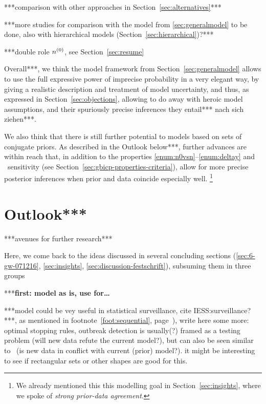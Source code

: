 ***comparison with other approaches in Section~\ref{sec:alternatives}***

***more studies for comparison with the model from \ref{sec:generalmodel} to be done,
also with hierarchical models (Section~\ref{sec:hierarchical})?***

***double role $n^{(0)}$, see Section~\ref{sec:resume}



Overall***, we think the model framework from Section~\ref{sec:generalmodel}
allows to use the full expressive power of imprecise probability %
in a very elegant way, by giving a realistic description and treatment
of model uncertainty, and thus, as expressed in Section~\ref{sec:objections},
allowing to do away with heroic model assumptions, and their spuriously precise inferences they entail*** nach sich ziehen***.

We also think that there is still further potential to models based on sets of conjugate priors.
As described in the Outlook below***,
further advances are within reach 
that, in addition to the properties \ref{enum:n0vsn}--\ref{enum:deltay} and \pdc\ sensitivity
(see Section~\ref{sec:gbicp-properties-criteria}),
allow for more precise posterior inferences when prior and data coincide especially well.%
\footnote{We already mentioned this this modelling goal in Section~\ref{sec:insights},
where we spoke of \emph{strong prior-data agreement}.}



\section{Outlook***}
\label{sec:concluding-outlook}

***avenues for further research***

Here, we come back to the ideas discussed in several concluding sections
(\ref{sec:6-gw-071216}, \ref{sec:insights}, \ref{sec:discussion-festschrift}),
subsuming them in three groups

***\textbf{first: model as is, use for\dots }

***model could be vey useful in statistical surveillance, cite IESS:surveillance?***,
as mentioned in footnote~\ref{foot:sequential}, page~\pageref{foot:sequential}),
write here some more: optimal stopping rules, outbreak detection is usually(?)
framed as a testing problem (will new data refute the current model?),
but can also be seen similar to \pdc\ (is new data in conflict with current (prior) model?).
it might be interesting to see if rectangular sets or other shapes are good for this.  

